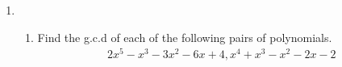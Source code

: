 \renewcommand{\theequation}{\theenumi}
\renewcommand{\thefigure}{\theenumi}
\begin{enumerate}[label=\thesubsection.\arabic*.,ref=\thesubsection.\theenumi]

\item 
\begin{enumerate}
\item Find the g.c.d of each of the following pairs of polynomials.
    \begin{align}
    2x^{5}-x^{3}-3x^{2}-6x+4 , x^{4}+x^{3}-x^{2}-2x-2
    \end{align}
%
\\
\solution

\end{enumerate}
\end{enumerate}
